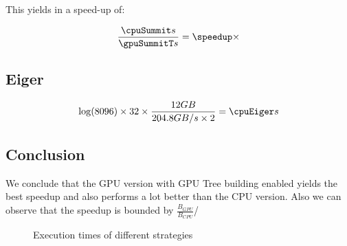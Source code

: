 \documentclass[]{article}
\begin{document}
This yields in a speed-up of:
\pgfmathsetmacro\speedup{\cpuSummit / \gpuSummitT}
\begin{center}
	\begin{equation}
		\frac{\cpuSummit s}{\gpuSummitT s} = \speedup \times
	\end{equation}
\end{center}


\vspace{5mm}


\subsection{Eiger}

\pgfmathsetmacro{}

\begin{center}
	\begin{equation}
		\log(\d) \times \p \times \frac{ \s GB }{204.8 GB/s \times 2} = \cpuEiger s
	\end{equation}
\end{center}

\subsection{Conclusion}

We conclude that the GPU version with GPU Tree building enabled yields the best speedup and also performs a lot better than the CPU version. Also we can observe that the speedup is bounded by $\frac{B_{GPU}}{B_{CPU}}$/ 

\begin{figure}[H]
	\begin{center}
	\end{center}

\caption{Execution times of different strategies}
\label{fig:exectimes}
\end{figure}
\end{document}
